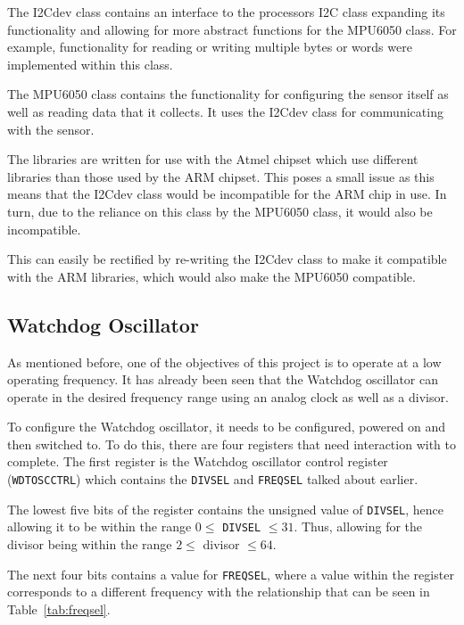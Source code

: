 The I2Cdev class contains an interface to the processors I2C class expanding its functionality and allowing for more abstract functions for the MPU6050 class. For example, functionality for reading or writing multiple bytes or words were implemented within this class.

The MPU6050 class contains the functionality for configuring the sensor itself as well as reading data that it collects. It uses the I2Cdev class for communicating with the sensor.

The libraries are written for use with the Atmel chipset which use different libraries than those used by the ARM chipset. This poses a small issue as this means that the I2Cdev class would be incompatible for the ARM chip in use. In turn, due to the reliance on this class by the MPU6050 class, it would also be incompatible. 

This can easily be rectified by re-writing the I2Cdev class to make it compatible with the ARM libraries, which would also make the MPU6050 compatible.


\subsection{Watchdog Oscillator}

As mentioned before, one of the objectives of this project is to operate at a low operating frequency. It has already been seen that the Watchdog oscillator can operate in the desired frequency range using an analog clock as well as a divisor. 

To configure the Watchdog oscillator, it needs to be configured, powered on and then switched to. To do this, there are four registers that need interaction with to complete. The first register is the Watchdog oscillator control register (\verb|WDTOSCCTRL|) which contains the \verb|DIVSEL| and \verb|FREQSEL| talked about earlier. 

The lowest five bits of the register contains the unsigned value of \verb|DIVSEL|, hence allowing it to be within the range $ 0 \leq $ \verb|DIVSEL| $ \leq 31$. Thus, allowing for the divisor being within the range $ 2 \leq $ divisor $ \leq 64$.

The next four bits contains a value for \verb|FREQSEL|, where a value within the register corresponds to a different frequency with the relationship that can be seen in Table~\ref{tab:freqsel}.

